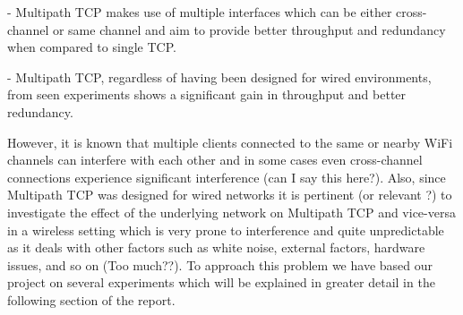 - Multipath TCP makes use of multiple interfaces which can be either 
cross-channel or same channel and aim to provide better throughput and 
redundancy when compared to single TCP.

- Multipath TCP, regardless of having been designed for wired environments, from 
seen experiments shows a significant gain in throughput and better redundancy.

However, it is known that multiple clients connected to the same or nearby WiFi 
channels can interfere with each other and in some cases even cross-channel 
connections experience significant interference (can I say this here?). Also, 
since Multipath TCP was designed for wired networks it is pertinent (or relevant
?) to investigate the effect of the underlying network on Multipath TCP and 
vice-versa in a wireless setting which is very prone to interference and quite 
unpredictable as it deals with other factors such as white noise, external 
factors, hardware issues, and so on (Too much??). 
To approach this problem we have based our project on several experiments which 
will be explained in greater detail in the following section of the report.



